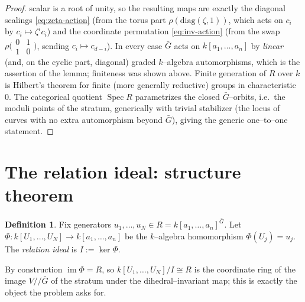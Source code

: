 \documentclass{amsart}
\theoremstyle{definition}
\newtheorem{definition}[theorem]{Definition}
\DeclareMathOperator{\Spec}{Spec}
\DeclareMathOperator{\im}{im}
\begin{document}
\begin{proof}
scalar is a root of unity, so the resulting maps are exactly the diagonal scalings
\eqref{eq:zeta-action} (from the torus part $\rho(\mathrm{diag}(\zeta,1))$, which acts
on $c_i$ by $c_i\mapsto\zeta^{i}c_i$) and the coordinate permutation
\eqref{eq:inv-action} (from the swap
$\rho\bigl(\begin{smallmatrix}0&1\\1&0\end{smallmatrix}\bigr)$, sending
$c_i\mapsto c_{d-i}$). In every case $\bar G$ acts on $k[a_1,\dots,a_n]$ by
\emph{linear} (and, on the cyclic part, diagonal) graded $k$--algebra automorphisms,
which is the assertion of the lemma; finiteness was shown above. Finite generation of $R$ over $k$ is Hilbert's theorem for finite (more
generally reductive) groups in characteristic $0$. The categorical quotient
$\Spec R$ parametrizes the closed $\bar G$--orbits, i.e.\ the moduli points of the
stratum, generically with trivial stabilizer (the locus of curves with no extra
automorphism beyond $\bar G$), giving the generic one--to--one statement.
\end{proof}

\section{The relation ideal: structure theorem}

\begin{definition}\label{def:I}
Fix generators $u_1,\dots,u_N\in R=k[a_1,\dots,a_n]^{\bar G}$. Let
$\Phi: k[U_1,\dots,U_N]\to k[a_1,\dots,a_n]$ be the $k$--algebra homomorphism
$\Phi(U_j)=u_j$. The \emph{relation ideal} is $I:=\ker\Phi$.
\end{definition}

By construction $\im\Phi=R$, so $k[U_1,\dots,U_N]/I\cong R$ is the coordinate ring
of the image $V/\!\!/\bar G$ of the stratum under the dihedral--invariant map; this
is exactly the object the problem asks for.
\end{document}
